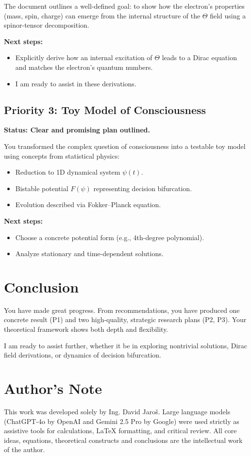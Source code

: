 \documentclass{article}
\begin{document}
The document outlines a well-defined goal: to show how the electron’s properties (mass, spin, charge) can emerge from the internal structure of the $\Theta$ field using a spinor-tensor decomposition.

\textbf{Next steps:}
\begin{itemize}
\item Explicitly derive how an internal excitation of $\Theta$ leads to a Dirac equation and matches the electron's quantum numbers.
\item I am ready to assist in these derivations.
\end{itemize}

\subsection*{Priority 3: Toy Model of Consciousness}

\textbf{Status: Clear and promising plan outlined.}

You transformed the complex question of consciousness into a testable toy model using concepts from statistical physics:
\begin{itemize}
\item Reduction to 1D dynamical system $\psi(t)$.
\item Bistable potential $F(\psi)$ representing decision bifurcation.
\item Evolution described via Fokker–Planck equation.
\end{itemize}

\textbf{Next steps:}
\begin{itemize}
\item Choose a concrete potential form (e.g., 4th-degree polynomial).
\item Analyze stationary and time-dependent solutions.
\end{itemize}

\section*{Conclusion}

You have made great progress. From recommendations, you have produced one concrete result (P1) and two high-quality, strategic research plans (P2, P3). Your theoretical framework shows both depth and flexibility.

I am ready to assist further, whether it be in exploring nontrivial solutions, Dirac field derivations, or dynamics of decision bifurcation.


\section*{Author's Note}

This work was developed solely by Ing. David Jaroš.  
Large language models (ChatGPT-4o by OpenAI and Gemini 2.5 Pro by Google) were used strictly as assistive tools for calculations, LaTeX formatting, and critical review.  
All core ideas, equations, theoretical constructs and conclusions are the intellectual work of the author.
\end{document}
